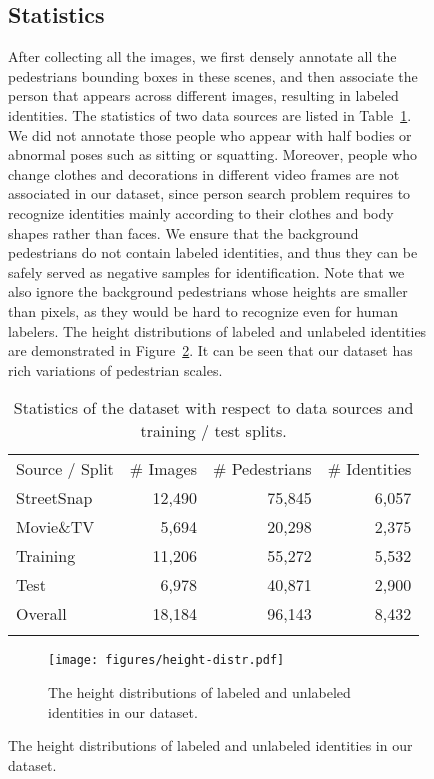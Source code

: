 \documentclass[10pt,twocolumn,letterpaper]{article}
\begin{document}
\begin{figure}[t]
\begin{center}
\subsection{Statistics} \label{sub:statistics}
After collecting all the  images, we first densely annotate all the  pedestrians bounding boxes in these scenes, and then associate the person that appears across different images, resulting in  labeled identities. The statistics of two data sources are listed in Table~\ref{tab:dataset-stats}. We did not annotate those people who appear with half bodies or abnormal poses such as sitting or squatting. Moreover, people who change clothes and decorations in different video frames are not associated in our dataset, since person search problem requires to recognize identities mainly according to their clothes and body shapes rather than faces. We ensure that the background pedestrians do not contain labeled identities, and thus they can be safely served as negative samples for identification. Note that we also ignore the background pedestrians whose heights are smaller than  pixels, as they would be hard to recognize even for human labelers. The height distributions of labeled and unlabeled identities are demonstrated in Figure~\ref{fig:height-distr}. It can be seen that our dataset has rich variations of pedestrian scales.
\begin{table}
\small
\begin{center}
\begin{tabular}{lrrr}
\hline\noalign{\smallskip}
\noalign{\smallskip}
Source / Split & \# Images & \# Pedestrians & \# Identities \\
\noalign{\smallskip}\hline\hline\noalign{\smallskip}
StreetSnap & 12,490 & 75,845 & 6,057 \\
Movie\&TV & 5,694 & 20,298 & 2,375 \\
\hline\noalign{\smallskip}
Training & 11,206 & 55,272 & 5,532 \\
Test & 6,978 & 40,871 & 2,900 \\
\hline\noalign{\smallskip}
Overall & 18,184 & 96,143 & 8,432 \\
\hline\noalign{\smallskip}
\end{tabular}
\end{center}
\vspace{-3ex}
\caption{Statistics of the dataset with respect to data sources and training / test splits.}
\label{tab:dataset-stats}
\end{table}

\begin{figure}[t]
\begin{center}
\texttt{[image: figures/height-distr.pdf]}
\end{center}
\vspace{-3ex}
\caption{The height distributions of labeled and unlabeled identities in our dataset.}
\vspace{-1ex}
\label{fig:height-distr}
\end{figure}



\end{center}
\end{figure}
\end{document}
